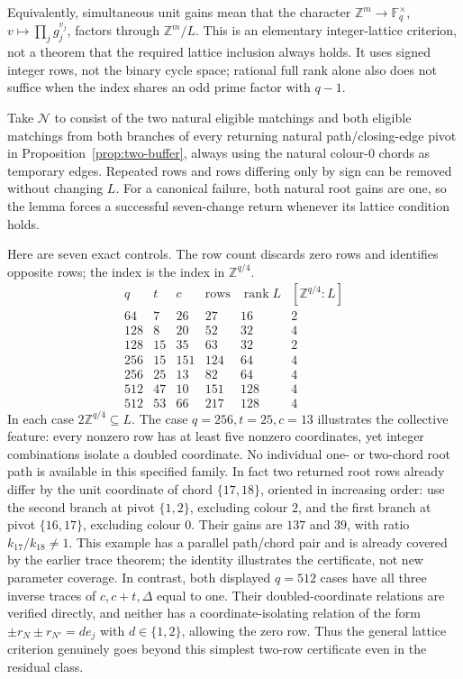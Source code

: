 \documentclass[11pt,a4paper]{article}
\theoremstyle{definition}
\theoremstyle{remark}
\newcommand{\ZZ}{\mathbb{Z}}
\begin{document}
Equivalently, simultaneous unit gains mean that the character $\ZZ^m\to\mathbb F_q^\times$, $v\mapsto\prod_j g_j^{v_j}$, factors through $\ZZ^m/L$.  This is an elementary integer-lattice criterion, not a theorem that the required lattice inclusion always holds.  It uses signed integer rows, not the binary cycle space; rational full rank alone also does not suffice when the index shares an odd prime factor with $q-1$.

Take $\mathcal N$ to consist of the two natural eligible matchings and both eligible matchings from both branches of every returning natural path/closing-edge pivot in Proposition~\ref{prop:two-buffer}, always using the natural colour-$0$ chords as temporary edges.  Repeated rows and rows differing only by sign can be removed without changing $L$.  For a canonical failure, both natural root gains are one, so the lemma forces a successful seven-change return whenever its lattice condition holds.

Here are seven exact controls.  The row count discards zero rows and identifies opposite rows; the index is the index in $\ZZ^{q/4}$.
\[
\begin{array}{c|r|r|r|r|r}
q&t&c&\text{rows}&\operatorname{rank}L&[\ZZ^{q/4}:L]\\\hline
64&7&26&27&16&2\\
128&8&20&52&32&4\\
128&15&35&63&32&2\\
256&15&151&124&64&4\\
256&25&13&82&64&4\\
512&47&10&151&128&4\\
512&53&66&217&128&4
\end{array}
\]
In each case $2\ZZ^{q/4}\subseteq L$.  The case $q=256,t=25,c=13$ illustrates the collective feature: every nonzero row has at least five nonzero coordinates, yet integer combinations isolate a doubled coordinate.  No individual one- or two-chord root path is available in this specified family.  In fact two returned root rows already differ by the unit coordinate of chord $\{17,18\}$, oriented in increasing order: use the second branch at pivot $\{1,2\}$, excluding colour $2$, and the first branch at pivot $\{16,17\}$, excluding colour $0$.  Their gains are $137$ and $39$, with ratio $k_{17}/k_{18}\ne1$.  This example has a parallel path/chord pair and is already covered by the earlier trace theorem; the identity illustrates the certificate, not new parameter coverage.  In contrast, both displayed $q=512$ cases have all three inverse traces of $c,c+t,\Delta$ equal to one.  Their doubled-coordinate relations are verified directly, and neither has a coordinate-isolating relation of the form $\pm r_N\pm r_{N'}=d e_j$ with $d\in\{1,2\}$, allowing the zero row.  Thus the general lattice criterion genuinely goes beyond this simplest two-row certificate even in the residual class.
\end{document}
